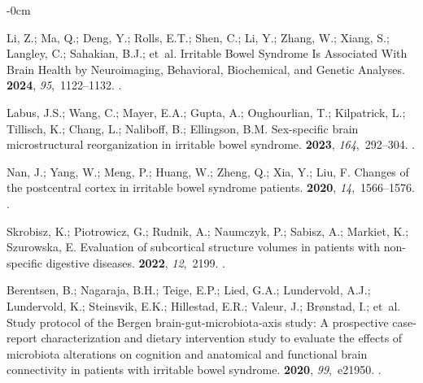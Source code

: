 \documentclass[diagnostics,article,accept,pdftex,moreauthors]{Definitions/mdpi}
\begin{document}
\begin{adjustwidth}{-\extralength}{0cm}
\begin{thebibliography}{999}
Li, Z.; Ma, Q.; Deng, Y.; Rolls, E.T.; Shen, C.; Li, Y.; Zhang, W.; Xiang, S.;
  Langley, C.; Sahakian, B.J.;  et~al.
\newblock Irritable Bowel Syndrome Is Associated With Brain Health by
  Neuroimaging, Behavioral, Biochemical, and Genetic Analyses.
 {\bf 2024}, {\em 95},~1122--1132.
.

Labus, J.S.; Wang, C.; Mayer, E.A.; Gupta, A.; Oughourlian, T.; Kilpatrick, L.;
  Tillisch, K.; Chang, L.; Naliboff, B.; Ellingson, B.M.
\newblock Sex-specific brain microstructural reorganization in irritable bowel
  syndrome.
 {\bf 2023}, {\em 164},~292--304.
.

Nan, J.; Yang, W.; Meng, P.; Huang, W.; Zheng, Q.; Xia, Y.; Liu, F.
\newblock Changes of the postcentral cortex in irritable bowel syndrome
  patients.
 {\bf 2020}, {\em 14},~1566--1576.
.

Skrobisz, K.; Piotrowicz, G.; Rudnik, A.; Naumczyk, P.; Sabisz, A.; Markiet,
  K.; Szurowska, E.
\newblock Evaluation of subcortical structure volumes in patients with
  non-specific digestive diseases.
 {\bf 2022}, {\em 12},~2199.
.

Berentsen, B.; Nagaraja, B.H.; Teige, E.P.; Lied, G.A.; Lundervold, A.J.;
  Lundervold, K.; Steinsvik, E.K.; Hillestad, E.R.; Valeur, J.; Br{\o}nstad,
  I.;  et~al.
\newblock Study protocol of the Bergen brain-gut-microbiota-axis study: A
  prospective case-report characterization and dietary intervention study to
  evaluate the effects of microbiota alterations on cognition and anatomical
  and functional brain connectivity in patients with irritable bowel syndrome.
 {\bf 2020}, {\em 99},~e21950.
.


\end{thebibliography}
\end{adjustwidth}
\end{document}
